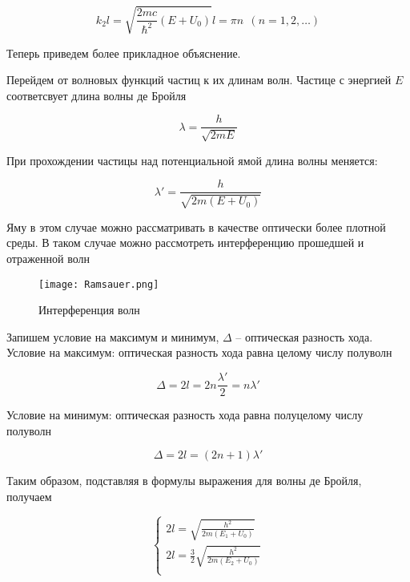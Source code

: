     \begin{equation}
        k_2 l = \sqrt{\frac{2mc}{\hbar^2}(E + U_0)} l = \pi n ~~ (n = 1, 2, \dots)
    \end{equation}

    Теперь приведем более прикладное объяснение.

    Перейдем от волновых функций частиц к их длинам волн. Частице с энергией $E$ соответсвует длина волны де Бройля

    \begin{equation}
        \lambda = \frac{h}{\sqrt{2mE}}
    \end{equation}

    При прохождении частицы над потенциальной ямой длина волны меняется:

    \begin{equation}
        \lambda' = \frac{h}{\sqrt{2m(E+U_0)}}
    \end{equation}

    Яму в этом случае можно рассматривать в качестве оптически более плотной среды. В таком случае можно рассмотреть
    интерференцию прошедшей и отраженной волн

    \begin{figure}
        \centering
        \texttt{[image: Ramsauer.png]}
        \caption{Интерференция волн}
        \label{fig:interf}
    \end{figure}

    Запишем условие на максимум и минимум, $\Delta$ -- оптическая разность хода. Условие на максимум: оптическая разность хода
    равна целому числу полуволн

    \begin{equation}
        \Delta = 2l = 2n \frac{\lambda'}{2} = n \lambda'
    \end{equation}

    Условие на минимум: оптическая разность хода равна полуцелому числу полуволн

    \begin{equation}
        \Delta = 2l = (2n + 1) \lambda'
    \end{equation}

    Таким образом, подставляя в формулы выражения для волны де Бройля, получаем

    \begin{equation}
        \begin{cases}
            2l = \sqrt{\frac{h^2}{2m (E_1 + U_0)}} \\
            2l = \frac{3}{2} \sqrt{\frac{h^2}{2m (E_2 + U_0)}} \\
        \end{cases}
    \end{equation}

